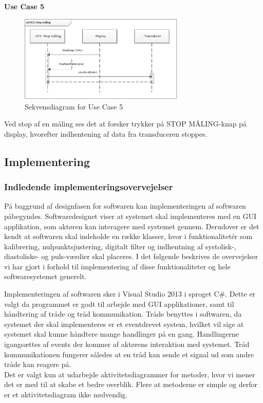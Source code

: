 \textbf{Use Case 5}
\begin{figure}[H]
	\centering
	\includegraphics[width=0.7\textwidth]{Figurer/UC5}
	\caption{Sekvensdiagram for Use Case 5}
\end{figure}
Ved stop af en måling ses det at forsker trykker på STOP MÅLING-knap på display, hvorefter indhentening af data fra transduceren stoppes.

\subsection{Implementering}
\subsubsection{Indledende implementeringsovervejelser}
På baggrund af designfasen for softwaren kan implementeringen af softwaren påbegyndes. Softwaredesignet viser at systemet skal implementeres med en GUI applikation, som aktøren kan interagere med systemet gennem. Derudover er det kendt at softwaren skal indeholde en række klasser, hvor i funktionalitetér som kalibrering, nulpunktsjustering, digitalt filter og indhentning af systolisk-, diastoliske- og puls-værdier skal placeres. I det følgende beskrives de overvejelser vi har gjort i forhold til implementering af disse funktionaliteter og hele softwaresystemet generelt. 

Implementeringen af softwaren sker i Visual Studio 2013 i sproget C\#. Dette er valgt da programmet er godt til arbejde med GUI applikationer, samt til håndtering af tråde og tråd kommunikation. Tråde benyttes i softwaren, da systemet der skal implementeres er et eventdrevet system, hvilket vil sige at systemet skal kunne håndtere mange handlinger på en gang. Handlingerne igangsættes af events der kommer af aktørens interaktion med systemet. Tråd kommunikationen fungerer således at en tråd kan sende et signal ud som andre tråde kan reagere på. \\
Det er valgt kun at udarbejde aktivitetsdiagrammer for metoder, hvor vi mener det er med til at skabe et bedre overblik. Flere at metoderne er simple og derfor er et aktivitetsdiagram ikke nødvendig. 

